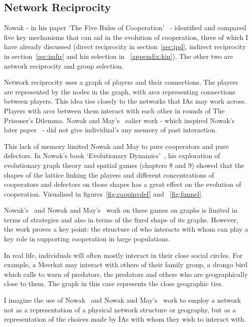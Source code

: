 \documentclass[]{final_report}
\begin{document}
\subsection{Network Reciprocity}
\label{appendix:netreciprocity}
Nowak - in his paper `The Five Rules of Cooperation'~\cite{five_rules_coop} - identified and compared five key mechanisms that can aid in the evolution of cooperation, three of which I have already discussed (direct reciprocity in section~\ref{sec:ipd}, indirect reciprocity in section~\ref{sec:indir} and kin selection in ~\ref{appendix:kin}). The other two are network reciprocity and group selection.\par
Network reciprocity uses a graph of players and their connections. The players are represented by the nodes in the graph, with arcs representing connections between players. This idea ties closely to the networks that IAs may work across. Players with arcs between them interact with each other in rounds of The Prisoner's Dilemma. Nowak and May's~\cite{spatial} ealier work - which inspired Nowak's later paper~\cite{five_rules_coop} - did not give individual's any memory of past interaction.\par
This lack of memory limited Nowak and May to pure cooperators and pure defectors. In Nowak's book `Evolutionary Dynamics'~\cite{nowak2006evolutionary}, his exploration of evolutionary graph theory and spatial games (chapters 8 and 9) showed that the shapes of the lattice linking the players and different concentrations of cooperators and defectors on those shapes has a great effect on the evolution of cooperation. Visualised in figures~\ref{fig:coopinvdef} and ~\ref{fig:funnel}.\par
Nowak's~\cite{five_rules_coop, nowak2006evolutionary} and Nowak and May's~\cite{spatial} work on these games on graphs is limited in terms of strategies and also in terms of the fixed shape of its graphs. However, the work proves a key point: the structure of who interacts with whom can play a key role in supporting cooperation in large populations.\par
In real life, individuals will often mostly interact in their close social circles. For example, a Meerkat may interact with others of their family group, a drongo bird which calls to warn of predators, the predators and others who are geographically close to them. The graph in this case represents the close geographic ties.\par 
I imagine the use of Nowak~\cite{five_rules_coop, nowak2006evolutionary} and Nowak and May's~\cite{spatial} work to employ a network not as a representation of a physical network structure or geography, but as a representation of the choices made by IAs with whom they wish to interact with.\par
\end{document}
